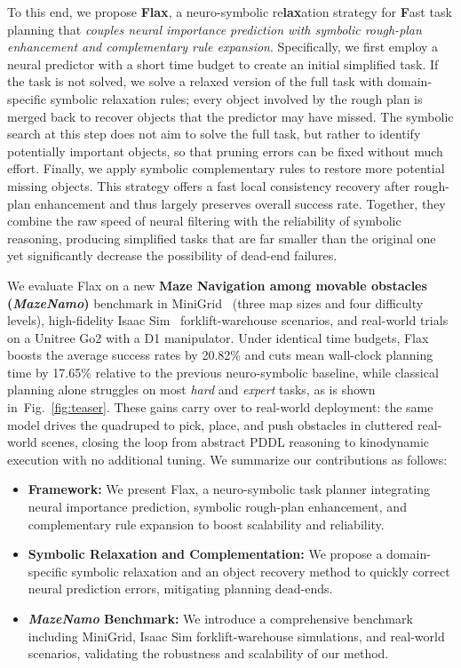 \documentclass[letterpaper, 10pt, journal, twoside]{IEEEtran}
\newcommand{\fref}[1]{Fig.~\ref{#1}}
\newcommand{\shortname}{Flax\xspace}
\begin{document}
To this end, we propose \textbf{\shortname}, a neuro-symbolic re\textbf{lax}ation strategy for \textbf{F}ast task planning that \emph{couples neural importance prediction with symbolic rough-plan enhancement and complementary rule expansion}. 
Specifically, we first employ a neural predictor with a short time budget to create an initial simplified task. 
If the task is not solved, we solve a relaxed version of the full task with domain-specific symbolic relaxation rules; every object involved by the rough plan is merged back to recover objects that the predictor may have missed. The symbolic search at this step does not aim to solve the full task, but rather to identify potentially important objects, so that pruning errors can be fixed without much effort.
Finally, we apply symbolic complementary rules to restore more potential missing objects. 
This strategy offers a fast local consistency recovery after rough-plan enhancement and thus largely preserves overall success rate. 
Together, they combine the raw speed of neural filtering with the reliability of symbolic reasoning, producing simplified tasks that are far smaller than the original one yet significantly decrease the possibility of dead-end failures.

We evaluate \shortname on a new \textbf{Maze Navigation among movable obstacles (\textit{MazeNamo})} benchmark in MiniGrid~\cite{MinigridMiniworld23} (three map sizes and four difficulty levels), high-fidelity Isaac Sim~\cite{makoviychuk2021isaac} 
forklift-warehouse scenarios, and real-world trials on a Unitree Go2 with a D1 manipulator. Under identical time budgets, \shortname boosts the average success rates by 20.82\% and cuts mean wall-clock planning time by 17.65\% relative to the previous neuro-symbolic baseline, while classical planning alone struggles on most \textit{hard} and \textit{expert} tasks, as is shown in~\fref{fig:teaser}. These gains carry over to real-world deployment: the same model drives the quadruped to pick, place, and push obstacles in cluttered real-world scenes, closing the loop from abstract PDDL reasoning to kinodynamic execution with no additional tuning. 
We summarize our contributions as follows:
\begin{itemize}[noitemsep,topsep=0pt]
    \item \textbf{Framework:} We present \shortname, a neuro-symbolic task planner integrating neural importance prediction, symbolic rough-plan enhancement, and complementary rule expansion to boost scalability and reliability.
    \item \textbf{Symbolic Relaxation and Complementation:} We propose a domain-specific symbolic relaxation and an object recovery method to quickly correct neural prediction errors, mitigating planning dead-ends.
    \item \textbf{\textit{MazeNamo} Benchmark:} We introduce a comprehensive benchmark including MiniGrid, Isaac Sim forklift-warehouse simulations, and real-world scenarios, validating the robustness and scalability of our method.
\end{itemize}
\end{document}
